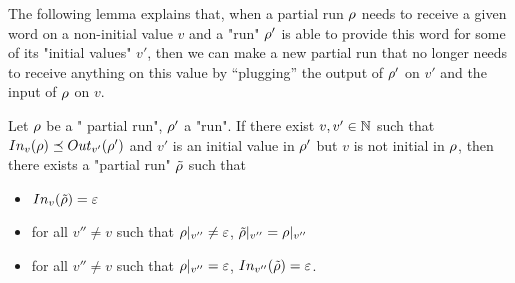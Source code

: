 The following lemma explains that, when a partial run $\rho$ needs to receive a given word on a non-initial value $v$ and a "run" $\rho'$ is able to provide this word for some of its "initial values" $v'$, then we can make a new partial run that no longer needs to receive anything on this value by ``plugging'' the output of $\rho'$ on $v'$ and the input of $\rho$ on $v$. 

\begin{lemma}
	\label{lem:boss-composition}
	Let $\rho$ be a " partial run", $\rho'$ a "run".
	If there exist $v, v' \in \mathbb{N}$ such that $\vinput{v}{\run} \subword \voutput{v'}{\run'}$ and $v'$ is an initial value in $\rho'$ but $v$ is not initial in $\rho$, then there exists a "partial run" $\Tilde{\rho}$ such that 
	\begin{itemize}
		\item $\vinput{v}{\Tilde{\run}} = \varepsilon$ 
		
		\item for all $v'' \neq v$ such that ${\rho}|_{v''} \neq \varepsilon$, ${\Tilde{\rho}}|_{v''} = {\rho}|_{v''}$
		
		\item for all $v'' \neq v$ such that ${\rho}|_{v''} = \varepsilon$, $\vinput{v''}{\Tilde{\run}} = \varepsilon$.
	\end{itemize}
\end{lemma}

